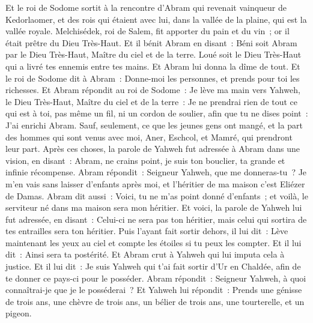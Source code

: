 \begin{multicols}{2}
Et le roi de Sodome sortit à la rencontre d'Abram qui revenait vainqueur de Kedorlaomer, et des rois qui étaient avec lui, dans la vallée de la plaine, qui est la vallée royale.
Melchisédek, roi de Salem, fit apporter du pain et du vin~; or il était prêtre du Dieu Très-Haut.
Et il bénit Abram en disant~: Béni soit Abram par le Dieu Très-Haut, Maître du ciel et de la terre.
Loué soit le Dieu Très-Haut qui a livré tes ennemis entre tes mains. Et Abram lui donna la dîme de tout.
Et le roi de Sodome dit à Abram~: Donne-moi les personnes, et prends pour toi les richesses.
Et Abram répondit au roi de Sodome~: Je lève ma main vers Yahweh, le Dieu Très-Haut, Maître du ciel et de la terre~:
Je ne prendrai rien de tout ce qui est à toi, pas même un fil, ni un cordon de soulier, afin que tu ne dises point~: J'ai enrichi Abram.
Sauf, seulement, ce que les jeunes gens ont mangé, et la part des hommes qui sont venus avec moi, Aner, Eschcol, et Mamré, qui prendront leur part.
\VerseOne{}Après ces choses, la parole de Yahweh fut adressée à Abram dans une vision, en disant~: Abram, ne crains point, je suis ton bouclier, ta grande et infinie récompense.
Abram répondit~: Seigneur Yahweh, que me donneras-tu~? Je m'en vais sans laisser d'enfants après moi, et l'héritier de ma maison c'est Eliézer de Damas.
Abram dit aussi~: Voici, tu ne m'as point donné d'enfants~; et voilà, le serviteur né dans ma maison sera mon héritier.
Et voici, la parole de Yahweh lui fut adressée, en disant~: Celui-ci ne sera pas ton héritier, mais celui qui sortira de tes entrailles sera ton héritier.
Puis l'ayant fait sortir dehors, il lui dit~: Lève maintenant les yeux au ciel et compte les étoiles si tu peux les compter. Et il lui dit~: Ainsi sera ta postérité.
Et Abram crut à Yahweh qui lui imputa cela à justice.
Et il lui dit~: Je suis Yahweh qui t'ai fait sortir d'Ur en Chaldée, afin de te donner ce pays-ci pour le posséder.
Abram répondit~: Seigneur Yahweh, à quoi connaîtrai-je que je le posséderai~?
Et Yahweh lui répondit~: Prends une génisse de trois ans, une chèvre de trois ans, un bélier de trois ans, une tourterelle, et un pigeon.

\end{multicols}
